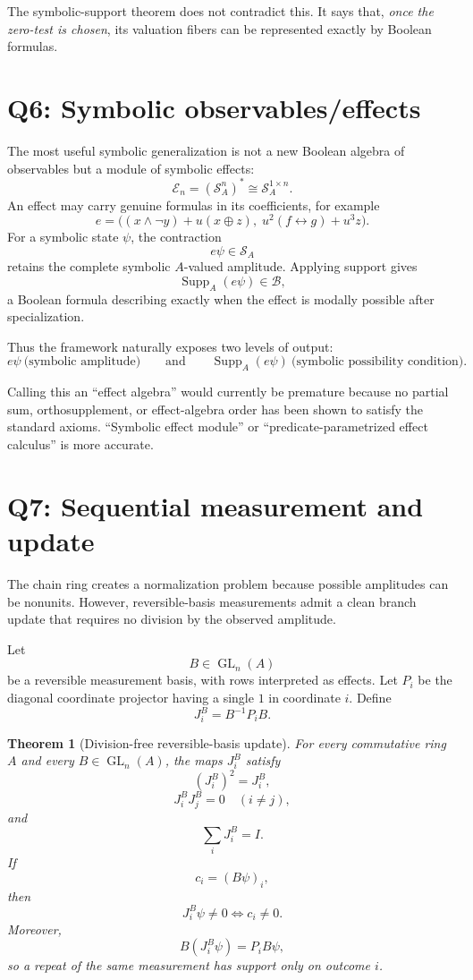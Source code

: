 \documentclass[11pt]{article}
\newtheorem{theorem}{Theorem}[section]
\theoremstyle{definition}
\newcommand{\B}{\mathcal{B}}
\newcommand{\Sring}{\mathcal{S}_A}
\newcommand{\Supp}{\operatorname{Supp}_A}
\newcommand{\GL}{\operatorname{GL}}
\begin{document}
The symbolic-support theorem does not contradict this. It says that, \emph{once the zero-test is chosen},
its valuation fibers can be represented exactly by Boolean formulas.

\section{Q6: Symbolic observables/effects}

The most useful symbolic generalization is not a new Boolean algebra of observables but a module of
symbolic effects:
\[
\mathcal E_n=(\Sring^n)^*\cong\Sring^{1\times n}.
\]
An effect may carry genuine formulas in its coefficients, for example
\[
e=
\bigl(
(x\land\neg y)+u(x\oplus z),\;
 u^2(f\leftrightarrow g)+u^3z
\bigr).
\]
For a symbolic state \(\psi\), the contraction
\[
e\psi\in\Sring
\]
retains the complete symbolic \(A\)-valued amplitude. Applying support gives
\[
\Supp(e\psi)\in\B,
\]
a Boolean formula describing exactly when the effect is modally possible after specialization.

Thus the framework naturally exposes two levels of output:
\[
\boxed{e\psi\ \text{(symbolic amplitude)}}
\qquad\text{and}\qquad
\boxed{\Supp(e\psi)\ \text{(symbolic possibility condition)}}.
\]

Calling this an ``effect algebra'' would currently be premature because no partial sum, orthosupplement,
or effect-algebra order has been shown to satisfy the standard axioms. ``Symbolic effect module'' or
``predicate-parametrized effect calculus'' is more accurate.

\section{Q7: Sequential measurement and update}

The chain ring creates a normalization problem because possible amplitudes can be nonunits. However,
reversible-basis measurements admit a clean branch update that requires no division by the observed
amplitude.

Let
\[
B\in\GL_n(A)
\]
be a reversible measurement basis, with rows interpreted as effects. Let \(P_i\) be the diagonal
coordinate projector having a single \(1\) in coordinate \(i\). Define
\[
\boxed{J_i^B=B^{-1}P_iB.}
\]

\begin{theorem}[Division-free reversible-basis update]
For every commutative ring \(A\) and every \(B\in\GL_n(A)\), the maps
\(J_i^B\) satisfy
\[
(J_i^B)^2=J_i^B,
\]
\[
J_i^BJ_j^B=0\quad(i\neq j),
\]
and
\[
\sum_iJ_i^B=I.
\]
If
\[
c_i=(B\psi)_i,
\]
then
\[
\boxed{J_i^B\psi\neq0\iff c_i\neq0.}
\]
Moreover,
\[
B(J_i^B\psi)=P_iB\psi,
\]
so a repeat of the same measurement has support only on outcome \(i\).
\end{theorem}
\end{document}

